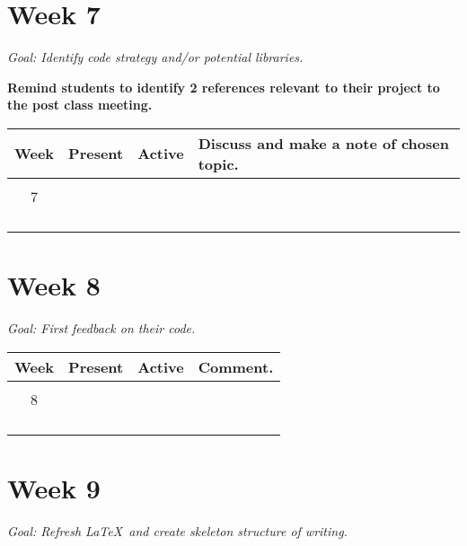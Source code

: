 \documentclass[12pt]{article}
\begin{document}
\section*{Week 7}
\centering\small{\textit{Goal: Identify code strategy and/or potential libraries.}}

\textbf{Remind students to identify 2 references relevant to their project to
the post class meeting.}

\begin{center}
	\begin{tabular}{c|l|l|p{}}
		\toprule
		Week        & Present & Active & Discuss and make a note of chosen topic.\\
		\midrule
		            &         &        & \\
		7           &         &        & \\
		            &         &        & \\
		            &         &        & \\
		            &         &        & \\
		            &         &        & \\
	\end{tabular}
\end{center}

\newpage

\section*{Week 8}
\centering\small{\textit{Goal: First feedback on their code.}}

\begin{center}
	\begin{tabular}{c|l|l|p{}}
		\toprule
		Week        & Present & Active & Comment.\\
		\midrule
		            &         &        & \\
		8           &         &        & \\
		            &         &        & \\
		            &         &        & \\
		            &         &        & \\
		            &         &        & \\
	\end{tabular}
\end{center}

\section*{Week 9}
\centering\small{\textit{Goal: Refresh \LaTeX\ and create skeleton structure of writing.}}
\end{document}
